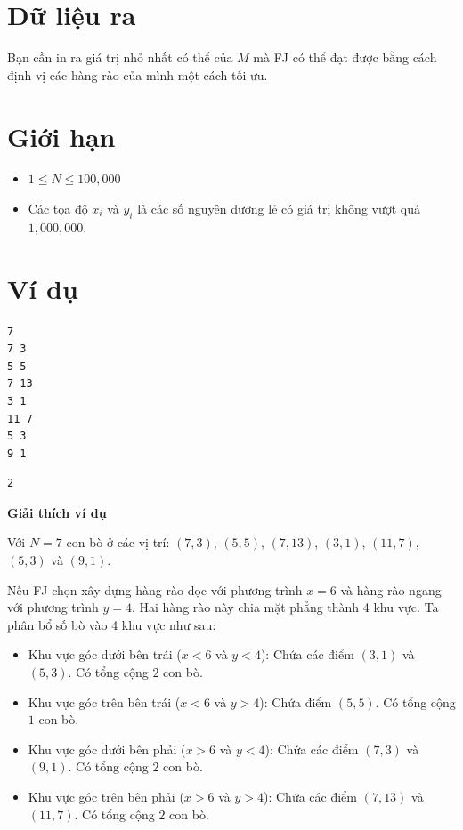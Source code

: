 \documentclass[12pt,a4paper]{article}
\newcommand{\explanation}{%
  \vspace{6pt}\textbf{\textcolor{sectioncolor}{Giải thích ví dụ}}\par\vspace{2pt}%
}
\begin{document}
\section*{Dữ liệu ra}
\begin{outputbox}
Bạn cần in ra giá trị nhỏ nhất có thể của $M$ mà FJ có thể đạt được bằng cách định vị các hàng rào của mình một cách tối ưu.
\end{outputbox}

\section*{Giới hạn}
\begin{constraintbox}
\begin{itemize}
    \item $1 \leq N \leq 100,000$
    \item Các tọa độ $x_i$ và $y_i$ là các số nguyên dương lẻ có giá trị không vượt quá $1,000,000$.
\end{itemize}
\end{constraintbox}

\section*{Ví dụ}
\begin{inputbox}
\begin{lstlisting}
7
7 3
5 5
7 13
3 1
11 7
5 3
9 1
\end{lstlisting}
\end{inputbox}

\begin{outputbox}
\begin{lstlisting}
2
\end{lstlisting}
\end{outputbox}

\explanation
Với $N=7$ con bò ở các vị trí: $(7, 3)$, $(5, 5)$, $(7, 13)$, $(3, 1)$, $(11, 7)$, $(5, 3)$ và $(9, 1)$.

Nếu FJ chọn xây dựng hàng rào dọc với phương trình $x=6$ và hàng rào ngang với phương trình $y=4$. Hai hàng rào này chia mặt phẳng thành 4 khu vực. Ta phân bổ số bò vào 4 khu vực như sau:

\begin{itemize}
    \item Khu vực góc dưới bên trái ($x < 6$ và $y < 4$): Chứa các điểm $(3, 1)$ và $(5, 3)$. Có tổng cộng $2$ con bò.
    \item Khu vực góc trên bên trái ($x < 6$ và $y > 4$): Chứa điểm $(5, 5)$. Có tổng cộng $1$ con bò.
    \item Khu vực góc dưới bên phải ($x > 6$ và $y < 4$): Chứa các điểm $(7, 3)$ và $(9, 1)$. Có tổng cộng $2$ con bò.
    \item Khu vực góc trên bên phải ($x > 6$ và $y > 4$): Chứa các điểm $(7, 13)$ và $(11, 7)$. Có tổng cộng $2$ con bò.
\end{itemize}
\end{document}
